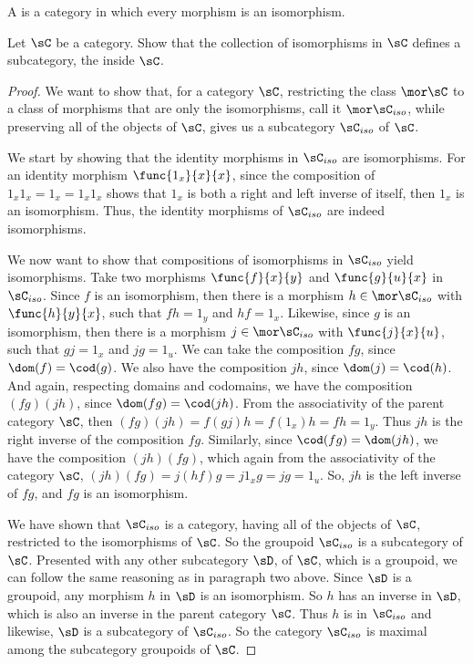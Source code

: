 \documentclass[main.tex]{subfiles}
\begin{document}
\begin{definition}
	A  is a category in which every morphism is an isomorphism.
\end{definition}
\popthm

\begin{exercise}
	Let \(\sC\) be a category. Show that the collection of isomorphisms in
	\(\sC\) defines a subcategory, the  inside \(\sC\).
\end{exercise}

\begin{proof}
	We want to show that, for a category \(\sC\), restricting the class
	\(\mor\sC\) to a class of morphisms that are only the isomorphisms, call it
	\(\mor\sC_{iso}\), while preserving all of the objects of \(\sC\), gives us
	a subcategory \(\sC_{iso}\) of \(\sC\).

	We start by showing that the identity morphisms in \(\sC_{iso}\) are
	isomorphisms. For an identity morphism \(\func{1_x}{x}{x}\), since the
	composition of \(1_x1_x=1_x=1_x1_x\) shows that \(1_x\) is both a right and
	left inverse of itself, then \(1_x\) is an isomorphism. Thus, the identity
	morphisms of \(\sC_{iso}\) are indeed isomorphisms.

	We now want to show that compositions of isomorphisms in \(\sC_{iso}\) yield
	isomorphisms. Take two morphisms \(\func{f}{x}{y}\) and \(\func{g}{u}{x}\)
	in \(\sC_{iso}\). Since \(f\) is an isomorphism, then there is a morphism
	\(h\in\mor\sC_{iso}\) with \(\func{h}{y}{x}\), such that \(fh=1_y\) and
	\(hf=1_x\). Likewise, since \(g\) is an isomorphism, then there is a
	morphism \(j\in\mor\sC_{iso}\) with \(\func{j}{x}{u}\), such that \(gj=1_x\)
	and \(jg=1_u\). We can take the composition \(fg\), since
	\(\dom(f)=\cod(g)\). We also have the composition \(jh\), since
	\(\dom(j)=\cod(h)\). And again, respecting domains and codomains, we have
	the composition \((fg)(jh)\), since \(\dom(fg)=\cod(jh)\). From the
	associativity of the parent category \(\sC\), then
	\((fg)(jh)=f(gj)h=f(1_x)h=fh=1_y\). Thus \(jh\) is the right inverse of the
	composition \(fg\). Similarly, since \(\cod(fg)=\dom(jh)\), we have the
	composition \((jh)(fg)\), which again from the associativity of the category
	\(\sC\), \((jh)(fg)=j(hf)g=j1_xg=jg=1_u\). So, \(jh\) is the left inverse of
	\(fg\), and \(fg\) is an isomorphism.

	We have shown that \(\sC_{iso}\) is a category, having all of the objects of
	\(\sC\), restricted to the isomorphisms of \(\sC\). So the groupoid
	\(\sC_{iso}\) is a subcategory of \(\sC\). Presented with any other
	subcategory \(\sD\), of \(\sC\), which is a groupoid, we can follow the same
	reasoning as in paragraph two above. Since \(\sD\) is a groupoid, any
	morphism \(h\) in \(\sD\) is an isomorphism. So \(h\) has an inverse in
	\(\sD\), which is also an inverse in the parent category \(\sC\). Thus \(h\)
	is in \(\sC_{iso}\) and likewise, \(\sD\) is a subcategory of \(\sC_{iso}\).
	So the category \(\sC_{iso}\) is maximal among the subcategory groupoids of
	\(\sC\).
\end{proof}
\end{document}
